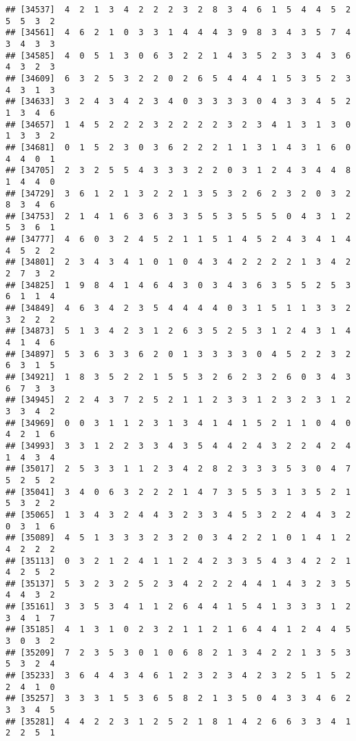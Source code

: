 \documentclass[
]{article}
\begin{document}
\begin{verbatim}
## [34537]  4  2  1  3  4  2  2  2  3  2  8  3  4  6  1  5  4  4  5  2  5  5  3  2
## [34561]  4  6  2  1  0  3  3  1  4  4  4  3  9  8  3  4  3  5  7  4  3  4  3  3
## [34585]  4  0  5  1  3  0  6  3  2  2  1  4  3  5  2  3  3  4  3  6  4  3  2  3
## [34609]  6  3  2  5  3  2  2  0  2  6  5  4  4  4  1  5  3  5  2  3  4  3  1  3
## [34633]  3  2  4  3  4  2  3  4  0  3  3  3  3  0  4  3  3  4  5  2  1  3  4  6
## [34657]  1  4  5  2  2  2  3  2  2  2  2  3  2  3  4  1  3  1  3  0  1  3  3  2
## [34681]  0  1  5  2  3  0  3  6  2  2  2  1  1  3  1  4  3  1  6  0  4  4  0  1
## [34705]  2  3  2  5  5  4  3  3  3  2  2  0  3  1  2  4  3  4  4  8  1  4  4  0
## [34729]  3  6  1  2  1  3  2  2  1  3  5  3  2  6  2  3  2  0  3  2  8  3  4  6
## [34753]  2  1  4  1  6  3  6  3  3  5  5  3  5  5  5  0  4  3  1  2  5  3  6  1
## [34777]  4  6  0  3  2  4  5  2  1  1  5  1  4  5  2  4  3  4  1  4  4  5  2  2
## [34801]  2  3  4  3  4  1  0  1  0  4  3  4  2  2  2  2  1  3  4  2  2  7  3  2
## [34825]  1  9  8  4  1  4  6  4  3  0  3  4  3  6  3  5  5  2  5  3  6  1  1  4
## [34849]  4  6  3  4  2  3  5  4  4  4  4  0  3  1  5  1  1  3  3  2  3  2  2  2
## [34873]  5  1  3  4  2  3  1  2  6  3  5  2  5  3  1  2  4  3  1  4  4  1  4  6
## [34897]  5  3  6  3  3  6  2  0  1  3  3  3  3  0  4  5  2  2  3  2  6  3  1  5
## [34921]  1  8  3  5  2  2  1  5  5  3  2  6  2  3  2  6  0  3  4  3  6  7  3  3
## [34945]  2  2  4  3  7  2  5  2  1  1  2  3  3  1  2  3  2  3  1  2  3  3  4  2
## [34969]  0  0  3  1  1  2  3  1  3  4  1  4  1  5  2  1  1  0  4  0  4  2  1  6
## [34993]  3  3  1  2  2  3  3  4  3  5  4  4  2  4  3  2  2  4  2  4  1  4  3  4
## [35017]  2  5  3  3  1  1  2  3  4  2  8  2  3  3  3  5  3  0  4  7  5  2  5  2
## [35041]  3  4  0  6  3  2  2  2  1  4  7  3  5  5  3  1  3  5  2  1  5  3  2  2
## [35065]  1  3  4  3  2  4  4  3  2  3  3  4  5  3  2  2  4  4  3  2  0  3  1  6
## [35089]  4  5  1  3  3  3  2  3  2  0  3  4  2  2  1  0  1  4  1  2  4  2  2  2
## [35113]  0  3  2  1  2  4  1  1  2  4  2  3  3  5  4  3  4  2  2  1  4  2  5  2
## [35137]  5  3  2  3  2  5  2  3  4  2  2  2  4  4  1  4  3  2  3  5  4  4  3  2
## [35161]  3  3  5  3  4  1  1  2  6  4  4  1  5  4  1  3  3  3  1  2  3  4  1  7
## [35185]  4  1  3  1  0  2  3  2  1  1  2  1  6  4  4  1  2  4  4  5  3  0  3  2
## [35209]  7  2  3  5  3  0  1  0  6  8  2  1  3  4  2  2  1  3  5  3  5  3  2  4
## [35233]  3  6  4  4  3  4  6  1  2  3  2  3  4  2  3  2  5  1  5  2  2  4  1  0
## [35257]  3  3  3  1  5  3  6  5  8  2  1  3  5  0  4  3  3  4  6  2  3  3  4  5
## [35281]  4  4  2  2  3  1  2  5  2  1  8  1  4  2  6  6  3  3  4  1  2  2  5  1

\end{verbatim}
\end{document}
